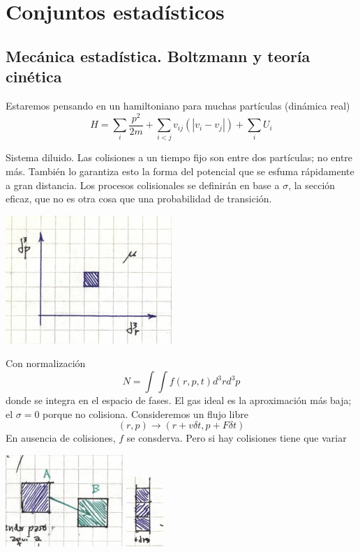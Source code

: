 \documentclass[10pt,oneside]{CBFT_book}
\begin{document}
\chapter{Conjuntos estadísticos}


\section{Mecánica estadística. Boltzmann y teoría cinética}

Estaremos pensando en un hamiltoniano para muchas partículas (dinámica real)
\[
	H = \sum_i \frac{p^2}{2m} + \sum_{i < j} v_{ij}(|v_i-v_j|) + \sum_i U_i
\]

Sistema diluido. Las colisiones a un tiempo fijo son entre dos partículas; no entre más.
También lo garantiza esto la forma del potencial que se esfuma rápidamente a gran distancia.
Los procesos colisionales se definirán en base a $\sigma$, la sección eficaz, que no es otra cosa
que una probabilidad de transición.

\includegraphics[scale=0.5]{images/1606329227.jpg}

Con normalización
\[
	N = \int \int f(r,p,t) d^3r d^3p
\]
donde se integra en el espacio de fases.
El gas ideal es la aproximación más baja; el $\sigma = 0$ porque no colisiona.
Consideremos un flujo libre
\[
	(r,p) \to ( r + v \delta t, p + F \delta t )
\]
En ausencia de colisiones, $f$ se consderva. Pero si hay colisiones tiene que variar

\includegraphics[scale=0.5]{images/1606329231.jpg}
\includegraphics[scale=0.5]{images/1606329234.jpg}
\end{document}
